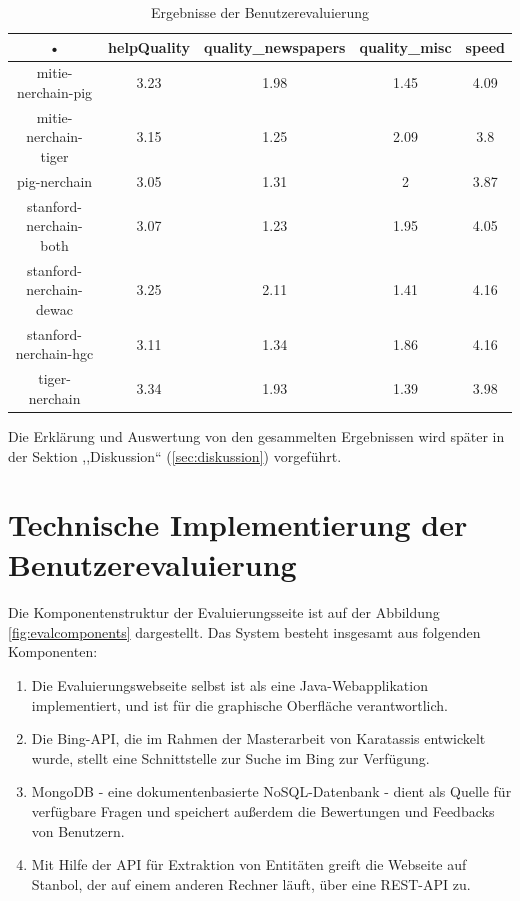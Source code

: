 \begin{table}
\begin{tabular}{|c|c|c|c|c|}
\hline 
• & helpQuality & quality\_newspapers & quality\_misc & speed \\ 
\hline 
mitie-nerchain-pig & 3.23 & 1.98 & 1.45 & 4.09 \\ 
\hline 
mitie-nerchain-tiger & 3.15 & 1.25 & 2.09 & 3.8 \\ 
\hline 
pig-nerchain & 3.05 & 1.31 & 2 & 3.87 \\ 
\hline 
stanford-nerchain-both & 3.07 & 1.23 & 1.95 & 4.05 \\ 
\hline 
stanford-nerchain-dewac & 3.25 & 2.11 & 1.41 & 4.16 \\ 
\hline 
stanford-nerchain-hgc & 3.11 & 1.34 & 1.86 & 4.16 \\ 
\hline 
tiger-nerchain & 3.34 & 1.93 & 1.39 & 3.98 \\ 
\hline 
\end{tabular} 
\caption{Ergebnisse der Benutzerevaluierung}
\label{app:RESULTS}
\end{table}

Die Erklärung und Auswertung von den gesammelten Ergebnissen wird später in der Sektion ,,Diskussion`` (\ref{sec:diskussion}) vorgeführt. 

\section{Technische Implementierung der Benutzerevaluierung}
\paragraph{}
Die Komponentenstruktur der Evaluierungsseite ist auf der Abbildung \ref{fig:evalcomponents} dargestellt. Das System besteht insgesamt aus folgenden Komponenten:
\begin{enumerate}
\item Die Evaluierungswebseite selbst ist als eine Java-Webapplikation implementiert, und ist für die graphische Oberfläche verantwortlich.
\item Die Bing-API, die im Rahmen der Masterarbeit von Karatassis\cite{Karatassis:15} entwickelt wurde, stellt eine Schnittstelle zur Suche im Bing zur Verfügung.
\item MongoDB - eine dokumentenbasierte NoSQL-Datenbank - dient als Quelle für verfügbare Fragen und speichert außerdem die Bewertungen und Feedbacks von Benutzern.
\item Mit Hilfe der API für Extraktion von Entitäten greift die Webseite auf Stanbol, der auf einem anderen Rechner läuft, über eine REST-API zu. 
\end{enumerate}

